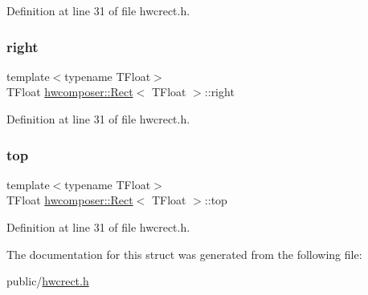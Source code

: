 Definition at line 31 of file hwcrect.\+h.

\mbox{\label{structhwcomposer_1_1Rect_ab93cc23bb659c53ef273acd7ab27ef9a}} 
\subsubsection{\texorpdfstring{right}{right}}
{\footnotesize\ttfamily template$<$typename T\+Float$>$ \\
T\+Float \mbox{\hyperlink{structhwcomposer_1_1Rect}{hwcomposer\+::\+Rect}}$<$ T\+Float $>$\+::right}



Definition at line 31 of file hwcrect.\+h.

\mbox{\label{structhwcomposer_1_1Rect_af8fc690f7c7980ff2b763c3cf047e401}} 
\subsubsection{\texorpdfstring{top}{top}}
{\footnotesize\ttfamily template$<$typename T\+Float$>$ \\
T\+Float \mbox{\hyperlink{structhwcomposer_1_1Rect}{hwcomposer\+::\+Rect}}$<$ T\+Float $>$\+::top}



Definition at line 31 of file hwcrect.\+h.



The documentation for this struct was generated from the following file\+:\begin{DoxyCompactItemize}
\item 
public/\mbox{\hyperlink{hwcrect_8h}{hwcrect.\+h}}\end{DoxyCompactItemize}
